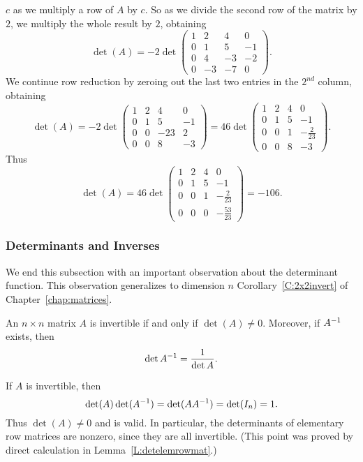 $c$ as we multiply a row of $A$ by $c$. So as we divide the second 
row of the matrix by $2$, we multiply the whole result by $2$, obtaining   
\[
\det(A) = -2\det\left(\begin{array}{rrrr} 1 & 2 & 4 & 0\\ 0 & 1 & 5 & -1 \\
0 & 4 & -3 & -2 \\ 0 & -3 & -7 & 0 \end{array}\right).
\] 
We continue row reduction by zeroing out the last two entries in
the $2^{nd}$ column, obtaining
\[
\det(A) = -2\det\left(\begin{array}{rrrr} 1 & 2 & 4 & 0\\ 0 & 1 & 5 & -1 \\
0 & 0 & -23 & 2 \\ 0 & 0 & 8 & -3 \end{array}\right)
= 46\det\left(\begin{array}{rrrr} 1 & 2 & 4 & 0\\ 0 & 1 & 5 & -1 \\
0 & 0 & 1 & -\frac{2}{23} \\ 0 & 0 & 8 & -3 \end{array}\right).
\] 
Thus
\[
\det(A) = 46\det\left(\begin{array}{rrrr} 1 & 2 & 4 & 0\\ 0 & 1 & 5 & -1 \\
0 & 0 & 1 & -\frac{2}{23} \\ 0 & 0 & 0 & -\frac{53}{23} \end{array}\right)
= -106.
\]  

\subsubsection*{Determinants and Inverses}

We end this subsection with an important observation about the
determinant function.  This observation generalizes to dimension
$n$ Corollary~\ref{C:2x2invert} of Chapter~\ref{chap:matrices}. 
\begin{thm}  \label{T:detandinv}
An $n\times n$ matrix $A$ is invertible if and only if $\det(A)\neq 0$.
Moreover, if $A^{-1}$ exists, then 
\begin{equation}  \label{E:detinv}
\det A^{-1} = \frac{1}{\det A}.
\end{equation}
\end{thm} 
 
\proof  If $A$ is invertible, then 
\[
\det(A)\det(A^{-1}) = \det(AA^{-1}) = \det(I_n) =1.
\]
Thus $\det(A)\neq 0$ and  is valid. In particular, the 
determinants of elementary row matrices are nonzero, since they are all
invertible. (This point was proved by direct calculation in
Lemma~\ref{L:detelemrowmat}.)
 
